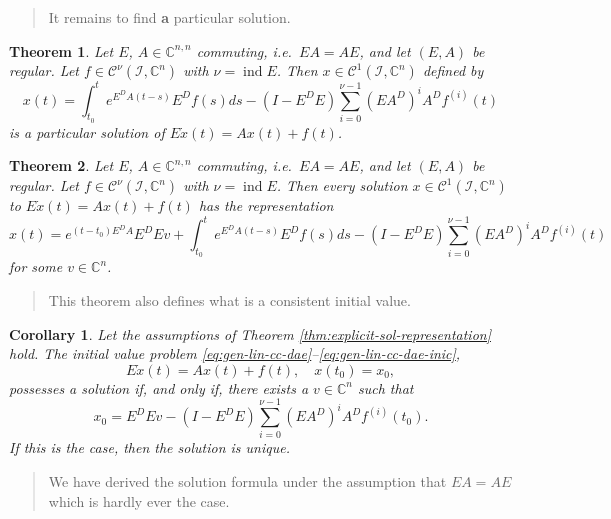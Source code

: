 \documentclass[]{book}
\newenvironment {JHSAYS} [0] {\begin{quote}\color{jhsc}} {\end{quote}}
\newtheorem{theorem}{Theorem}[chapter]
\newtheorem{corollary}{Corollary}[chapter]
\theoremstyle{definition}
\theoremstyle{definition}
\theoremstyle{definition}
\theoremstyle{definition}
\theoremstyle{remark}
\begin{document}
\begin{JHSAYS}
It remains to find \textbf{a} particular solution.
\end{JHSAYS}

\begin{theorem}
\protect\hypertarget{thm:exp-formula-particular-solution}{}{\label{thm:exp-formula-particular-solution} }Let \(E\), \(A \in \mathbb C^{n,n}\) commuting, i.e.~\(EA=AE\), and let \((E,A)\) be regular. Let \(f\in \mathcal C^\nu(\mathcal I, \mathbb C^n)\) with \(\nu = \operatorname{ind}E\). Then \(x\in \mathcal C^1(\mathcal I, \mathbb C^n)\) defined by
\[
x(t) = \int_{t_0}^t e^{E^DA(t-s)}E^Df(s)ds - (I-E^DE)\sum_{i=0}^{\nu-1}(EA^D)^iA^Df^{(i)}(t)
\]
is a particular solution of \(E\dot x(t) = Ax(t)+f(t)\).
\end{theorem}

\begin{theorem}
\protect\hypertarget{thm:explicit-sol-representation}{}{\label{thm:explicit-sol-representation} }Let \(E\), \(A \in \mathbb C^{n,n}\) commuting, i.e.~\(EA=AE\), and let \((E,A)\) be regular. Let \(f\in \mathcal C^\nu(\mathcal I, \mathbb C^n)\) with \(\nu = \operatorname{ind}E\). Then every solution \(x\in \mathcal C^1(\mathcal I, \mathbb C^n)\) to \(E\dot x(t) = Ax(t)+f(t)\) has the representation
\[
x(t) = e^{(t-t_0)E^DA}E^DEv +\int_{t_0}^t e^{E^DA(t-s)}E^Df(s)ds - (I-E^DE)\sum_{i=0}^{\nu-1}(EA^D)^iA^Df^{(i)}(t)
\]
for some \(v\in \mathbb C^n\).
\end{theorem}

\begin{JHSAYS}
This theorem also defines what is a consistent initial value.
\end{JHSAYS}

\begin{corollary}
\protect\hypertarget{cor:unnamed-chunk-32}{}{\label{cor:unnamed-chunk-32} }Let the assumptions of Theorem \ref{thm:explicit-sol-representation} hold. The initial value problem \eqref{eq:gen-lin-cc-dae}--\eqref{eq:gen-lin-cc-dae-inic},
\[
E\dot x (t) = Ax(t) + f(t), \quad x(t_0)=x_0,
\]
possesses a solution if, and only if, there exists a \(v\in \mathbb C^n\) such that
\[
x_0 = E^{D}Ev - (I-E^DE)\sum_{i=0}^{\nu-1}(EA^D)^iA^Df^{(i)}(t_0).
\]
If this is the case, then the solution is unique.
\end{corollary}

\begin{JHSAYS}
We have derived the solution formula under the assumption that \(EA=AE\)
which is hardly ever the case.
\end{JHSAYS}
\end{document}
